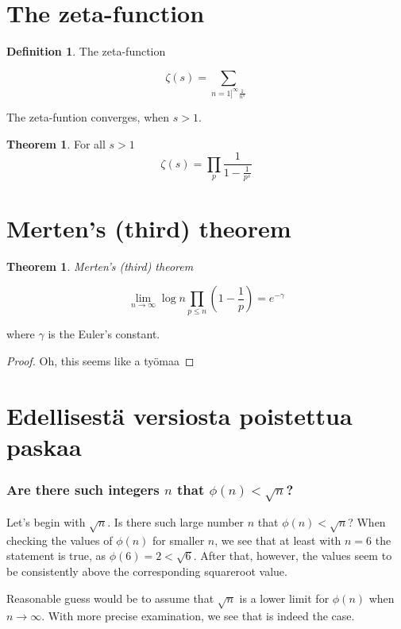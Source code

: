 \documentclass{article}
\theoremstyle{definition}
\newtheorem{definition}[subsection]{Definition}
\newtheorem{theorem}[subsection]{Theorem}
\begin{document}
\section{The zeta-function}

\begin{definition}{The zeta-function}

\begin{equation*}
    \zeta(s) = \sum_{n=1]^\infty \frac{1}{n^s}}
\end{equation*}

The zeta-funtion converges, when $s>1$.

\begin{theorem}
\label{lemma:zeta}
For all $s>1$
\begin{equation*}
    \zeta(s) = \prod_p \frac{1}{1-\frac{1}{p^s}}
\end{equation*}
\end{theorem}

\end{definition}

\section{Merten's (third) theorem}

\begin{theorem}{\emph{Merten's (third) theorem}}

\begin{equation*}
    \lim_{n \rightarrow \infty} \log n \prod_{p\leq n} \left(1-\frac{1}{p}\right) = e^{-\gamma}
\end{equation*}

where $\gamma$ is the Euler's constant.

\begin{proof}

Oh, this seems like a työmaa

\end{proof}

\end{theorem}

\section{Edellisestä versiosta poistettua paskaa}

\subsubsection{Are there such integers $n$ that $\phi(n) < \sqrt{n}$?}

Let's begin with $\sqrt{n}$. Is there such large number $n$ that $\phi(n) < \sqrt{n}$? When checking the values of $\phi(n)$ for smaller $n$, we see that at least with $n=6$ the statement is true, as $\phi(6)=2<\sqrt{6}$. After that, however, the values seem to be consistently above the corresponding squareroot value.

Reasonable guess would be to assume that $\sqrt{n}$ is a lower limit for $\phi(n)$ when $n \rightarrow \infty$. With more precise examination, we see that is indeed the case.
\end{document}
